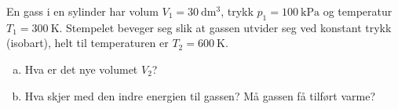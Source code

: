 %
En gass i en sylinder har volum $V_1 = \SI{30}{\deci\metre\cubed}$, trykk $p_1 = \SI{100}{\kilo\pascal}$ og temperatur $T_1 = \SI{300}{\kelvin}$. Stempelet beveger seg slik at gassen utvider seg ved konstant trykk (isobart), helt til temperaturen er $T_2 = \SI{600}{\kelvin}$.
\begin{enumerate}[a)]
    \item Hva er det nye volumet $V_2$?
    \item Hva skjer med den indre energien til gassen? Må gassen få tilført varme?
\end{enumerate}
%
